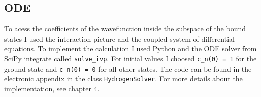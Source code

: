






\subsection{ODE}
To acess the coefficients of the wavefunction inside the subspace of the bound states I used the interaction picture and the coupled system of differential equations. 
To implement the calculation I used Python and the ODE solver from SciPy integrate called \texttt{solve\_ivp}.
For initial values I choosed \texttt{c\_n(0) = 1} for the ground state and \texttt{c\_n(0) = 0} for all other states.
The code can be found in the electronic appendix in the class \texttt{HydrogenSolver}.
For more details about the implementation, see chapter 4.






